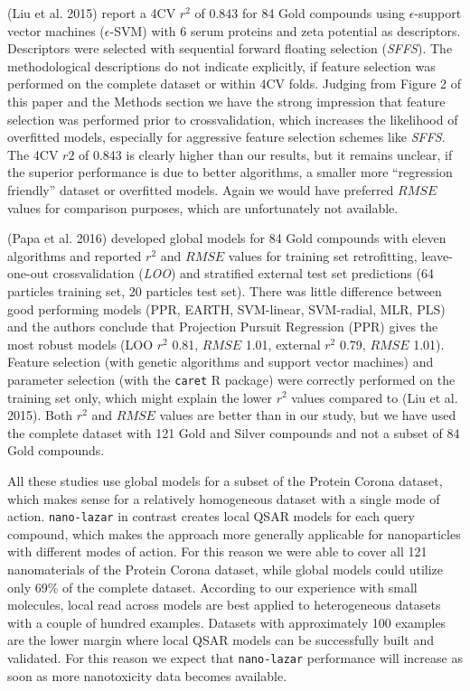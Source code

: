 \documentclass[utf8]{frontiersHLTH} %
\begin{document}
(Liu et al. 2015) report a 4CV \(r^2\) of 0.843 for 84 Gold compounds
using \(\epsilon\)-support vector machines (\(\epsilon\)-SVM) with 6
serum proteins and zeta potential as descriptors. Descriptors were
selected with sequential forward floating selection (\emph{SFFS}). The
methodological descriptions do not indicate explicitly, if feature
selection was performed on the complete dataset or within 4CV folds.
Judging from Figure 2 of this paper and the Methods section we have the
strong impression that feature selection was performed prior to
crossvalidation, which increases the likelihood of overfitted models,
especially for aggressive feature selection schemes like \emph{SFFS}.
The 4CV \(r2\) of 0.843 is clearly higher than our results, but it
remains unclear, if the superior performance is due to better
algorithms, a smaller more ``regression friendly'' dataset or overfitted
models. Again we would have preferred \(RMSE\) values for comparison
purposes, which are unfortunately not available.

(Papa et al. 2016) developed global models for 84 Gold compounds with
eleven algorithms and reported \(r^2\) and \(RMSE\) values for training
set retrofitting, leave-one-out crossvalidation (\emph{LOO}) and
stratified external test set predictions (64 particles training set, 20
particles test set). There was little difference between good performing
models (PPR, EARTH, SVM-linear, SVM-radial, MLR, PLS) and the authors
conclude that Projection Pursuit Regression (PPR) gives the most robust
models (LOO \(r^2\) 0.81, \(RMSE\) 1.01, external \(r^2\) 0.79, \(RMSE\)
1.01). Feature selection (with genetic algorithms and support vector
machines) and parameter selection (with the \texttt{caret} R package)
were correctly performed on the training set only, which might explain
the lower \(r^2\) values compared to (Liu et al. 2015). Both \(r^2\) and
\(RMSE\) values are better than in our study, but we have used the
complete dataset with 121 Gold and Silver compounds and not a subset of
84 Gold compounds.

All these studies use global models for a subset of the Protein Corona
dataset, which makes sense for a relatively homogeneous dataset with a
single mode of action. \texttt{nano-lazar} in contrast creates local
QSAR models for each query compound, which makes the approach more
generally applicable for nanoparticles with different modes of action.
For this reason we were able to cover all 121 nanomaterials of the
Protein Corona dataset, while global models could utilize only 69\% of
the complete dataset. According to our experience with small molecules,
local read across models are best applied to heterogeneous datasets with
a couple of hundred examples. Datasets with approximately 100 examples
are the lower margin where local QSAR models can be successfully built
and validated. For this reason we expect that \texttt{nano-lazar}
performance will increase as soon as more nanotoxicity data becomes
available.
\end{document}
